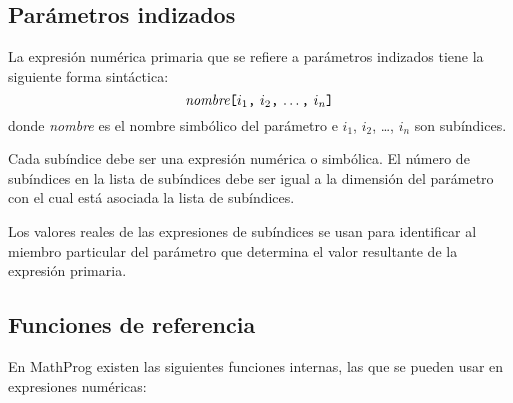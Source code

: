 \documentclass[11pt,spanish]{report}
\begin{document}
\subsection{Parámetros indizados}

La expresión numérica primaria que se refiere a parámetros indizados tiene la siguiente forma sintáctica:
$$
\mbox{{\it nombre}{\tt[}$i_1${\tt,} $i_2${\tt,} \dots{\tt,} $i_n${\tt]}}
$$
donde {\it nombre} es el nombre simbólico del parámetro e $i_1$, $i_2$,
\dots, $i_n$ son subíndices.

Cada subíndice debe ser una expresión numérica o simbólica. El número de subíndices en la lista de subíndices debe ser igual a la dimensión del parámetro con el cual está asociada la lista de subíndices.

Los valores reales de las expresiones de subíndices se usan para identificar al miembro particular del parámetro que determina el valor resultante de la expresión primaria.

\subsection{Funciones de referencia}

En MathProg existen las siguientes funciones internas, las que se pueden usar en expresiones numéricas:
\end{document}
